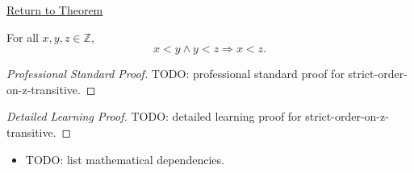\newpage
{}
\label{prf:strict-order-on-z-transitive}

\begin{remark*}[Return]
\hyperref[thm:strict-order-on-z-transitive]{Return to Theorem}
\end{remark*}

\begin{theorem*}
For all $x,y,z\in\mathbb{Z}$,
\[
x<y\land y<z \Longrightarrow x<z.
\]
\end{theorem*}

\begin{proof}[Professional Standard Proof]
\LRAProofBodyStart
TODO: professional standard proof for strict-order-on-z-transitive.
\end{proof}

\begin{proof}[Detailed Learning Proof]
\LRAProofBodyStart
TODO: detailed learning proof for strict-order-on-z-transitive.
\end{proof}

\begin{remark*}
\end{remark*}

\begin{dependencies}
\begin{itemize}
  \item TODO: list mathematical dependencies.
\end{itemize}
\end{dependencies}

\clearpage
